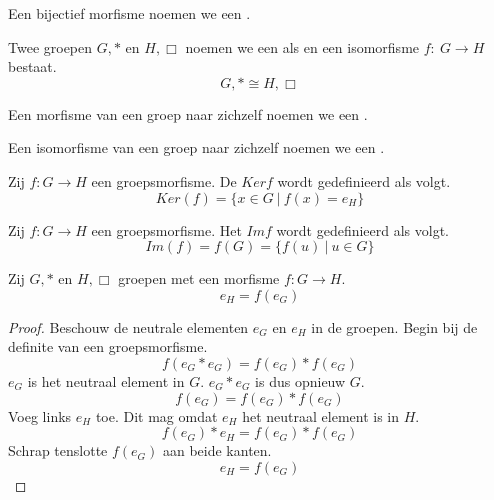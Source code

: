 \documentclass[main.tex]{subfiles}
\begin{document}
\begin{de}
  Een bijectief morfisme noemen we een .
\end{de}

\begin{de}
  Twee groepen $G,*$ en $H,\Box$ noemen we een  als en een isomorfisme $f:\ G \rightarrow H$ bestaat.
  \[ G,* \cong H,\Box \]
\end{de}

\begin{de}
  Een morfisme van een groep naar zichzelf noemen we een .
\end{de}

\begin{de}
  Een isomorfisme van een groep naar zichzelf noemen we een .
\end{de}

\begin{de}
  Zij $f: G \rightarrow H$ een groepsmorfisme. De  $Ker f$ wordt gedefinieerd als volgt.
  \[ Ker(f) = \{ x \in G \ |\ f(x) = e_{H} \} \]
\end{de}

\begin{de}
  Zij $f: G \rightarrow H$ een groepsmorfisme. Het  $Im f$ wordt gedefinieerd als volgt.
  \[ Im(f) = f(G) = \{ f(u) \ |\ u \in G \} \]
\end{de}


\begin{st}
  \label{st:groepsmorfisme-behoudt-neutraal-element}
  Zij $G,*$ en $H,\Box$ groepen met een morfisme $f: G \rightarrow H$.
  \[ e_{H} = f(e_{G}) \]

  \begin{proof}
    Beschouw de neutrale elementen $e_{G}$ en $e_{H}$ in de groepen.
    Begin bij de definite van een groepsmorfisme.
    \[ f(e_{G}*e_{G}) = f(e_{G})*f(e_{G}) \]
    $e_{G}$ is het neutraal element in $G$. $e_{G}*e_{G}$ is dus opnieuw $G$.
    \[ f(e_{G}) = f(e_{G})*f(e_{G}) \]
    Voeg links $e_{H}$ toe. Dit mag omdat $e_{H}$ het neutraal element is in $H$.
    \[ f(e_{G})*e_{H} = f(e_{G})*f(e_{G}) \]
    Schrap tenslotte $f(e_{G})$ aan beide kanten.
    \[ e_{H} = f(e_{G}) \]
  \end{proof}
\end{st}
\end{document}
